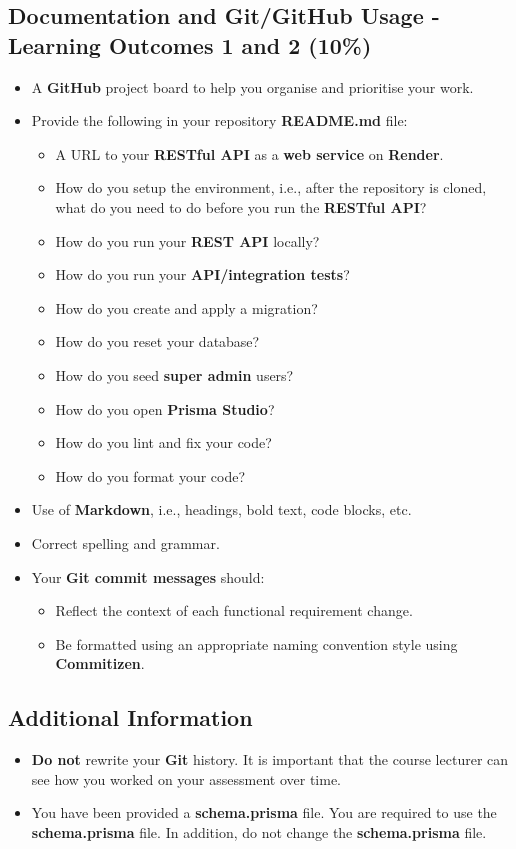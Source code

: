 \documentclass{article}
\begin{document}
\subsection*{Documentation and Git/GitHub Usage - Learning Outcomes 1 and 2 (10\%)}
\begin{itemize}
	\item A \textbf{GitHub} project board to help you organise and prioritise your work. 
	\item Provide the following in your repository \textbf{README.md} file:
	\begin{itemize}
		\item A URL to your \textbf{RESTful API} as a \textbf{web service} on \textbf{Render}.
		\item How do you setup the environment, i.e., after the repository is cloned, what do you need to do before you run the \textbf{RESTful API}?
		\item How do you run your \textbf{REST API} locally?
		\item How do you run your \textbf{API/integration tests}?
		\item How do you create and apply a migration?  
		\item How do you reset your database?
		\item How do you seed \textbf{super admin} users?
		\item How do you open \textbf{Prisma Studio}?
		\item How do you lint and fix your code?
		\item How do you format your code?
	\end{itemize}
	\item Use of \textbf{Markdown}, i.e., headings, bold text, code blocks, etc.
	\item Correct spelling and grammar. 
	\item Your \textbf{Git commit messages} should:
	\begin{itemize}
		\item Reflect the context of each functional requirement change.
		\item Be formatted using an appropriate naming convention style using \textbf{Commitizen}.
	\end{itemize}	
\end{itemize}

\subsection*{Additional Information}
\begin{itemize}
	\item \textbf{Do not} rewrite your \textbf{Git} history. It is important that the course lecturer can see how you worked on your assessment over time.
	\item You have been provided a \textbf{schema.prisma} file. You are required to use the \textbf{schema.prisma} file. In addition, do not change the \textbf{schema.prisma} file.
\end{itemize}
\end{document}
